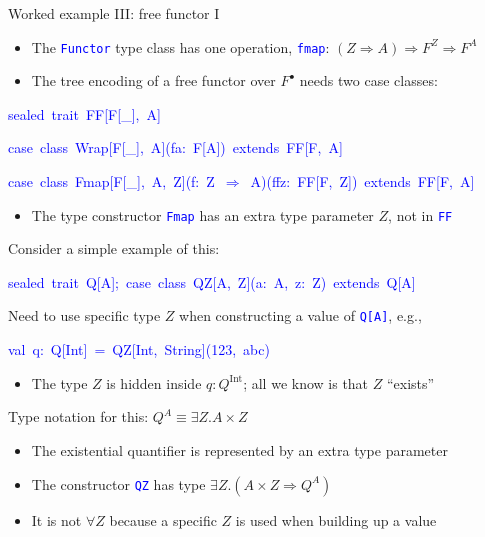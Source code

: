 \documentclass[english,,russian]{beamer}
\newenvironment{lyxcode}
  {\par\begin{list}{}{
    \setlength{\rightmargin}{\leftmargin}
    \setlength{\listparindent}{0pt}%
    \raggedright
    \setlength{\itemsep}{0pt}
    \setlength{\parsep}{0pt}
    \normalfont\ttfamily}%
   \def\{{\char`\{}
   \def\}{\char`\}}
   \def\textasciitilde{\char`\~}
   \item[]}
  {\end{list}}
\begin{document}
\begin{frame}{Worked example III: free functor I}
\begin{itemize}
\item The \texttt{\textcolor{blue}{\footnotesize{}Functor}} type class has
one operation, \texttt{\textcolor{blue}{\footnotesize{}fmap}}: $\left(Z\Rightarrow A\right)\Rightarrow F^{Z}\Rightarrow F^{A}$ 
\item The tree encoding of a free functor over $F^{\bullet}$ needs two
case classes:
\end{itemize}
\begin{lyxcode}
\textcolor{blue}{\footnotesize{}sealed~trait~FF{[}F{[}\_{]},~A{]}}{\footnotesize\par}

\textcolor{blue}{\footnotesize{}case~class~Wrap{[}F{[}\_{]},~A{]}(fa:~F{[}A{]})~extends~FF{[}F,~A{]}}{\footnotesize\par}

\textcolor{blue}{\footnotesize{}case~class~Fmap{[}F{[}\_{]},~A,~Z{]}(f:~Z~\ensuremath{\Rightarrow}~A)(ffz:~FF{[}F,~Z{]})~extends~FF{[}F,~A{]}}{\footnotesize\par}
\end{lyxcode}
\begin{itemize}
\item The type constructor \texttt{\textcolor{blue}{\footnotesize{}Fmap}}
has an extra type parameter $Z$, not in \texttt{\textcolor{blue}{\footnotesize{}FF}} 
\end{itemize}
Consider a simple example of this:
\begin{lyxcode}
\textcolor{blue}{\footnotesize{}sealed~trait~Q{[}A{]};~case~class~QZ{[}A,~Z{]}(a:~A,~z:~Z)~extends~Q{[}A{]}}{\footnotesize\par}
\end{lyxcode}
\begin{itemize}
\item Need to use specific type $Z$ when constructing a value of \texttt{\textcolor{blue}{\footnotesize{}Q{[}A{]}}},
e.g.,
\begin{lyxcode}
\textcolor{blue}{\footnotesize{}val~q:~Q{[}Int{]}~=~QZ{[}Int,~String{]}(123,~\textquotedbl abc\textquotedbl )}{\footnotesize\par}
\end{lyxcode}
\begin{itemize}
\item The type $Z$ is hidden inside $q:Q^{\text{Int}}$; all we know is
that $Z$ ``exists''
\end{itemize}
\item Type notation for this: $Q^{A}\equiv\exists Z.A\times Z$
\begin{itemize}
\item The existential quantifier is represented by an extra type parameter
\item The constructor \texttt{\textcolor{blue}{\footnotesize{}QZ}} has type
$\exists Z.\left(A\times Z\Rightarrow Q^{A}\right)$
\item It is not $\forall Z$ because a specific $Z$ is used when building
up a value
\end{itemize}
\end{itemize}
\end{frame}
\end{document}
